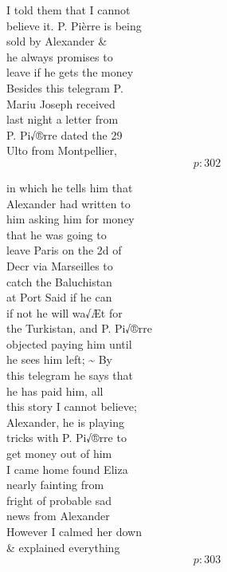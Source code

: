 \documentclass{report}
\begin{document}
	\par{
 	I told them that I cannot\ \\believe it. P. Pièrre is being\ \\sold by Alexander \&\ \\he always promises to\ \\leave if he gets the money\ \\Besides this telegram P.\ \\Mariu Joseph received\ \\last night a letter from\ \\P. Pi√®rre dated the 29\ \\Ulto from Montpellier,\ \\
  \[p: 302 \]

	}


	\par{
 	in which he tells him that\ \\Alexander had written to\ \\him asking him for money\ \\that he was going to\ \\leave Paris on the 2d of\ \\Decr via Marseilles to\ \\catch the Baluchistan\ \\at Port Said if he can\ \\if not he will wa√Æt for\ \\the Turkistan, and P. Pi√®rre\ \\objected paying him until\ \\he sees him left; \~{} By\ \\this telegram he says that\ \\he has paid him, all\ \\this story I cannot believe;\ \\Alexander, he is playing\ \\tricks with P. Pi√®rre to\ \\get money out of him\ \\I came home found Eliza\ \\nearly fainting from\ \\fright of probable sad\ \\news from Alexander\ \\However I calmed her down\ \\\& explained everything\ \\
  \[p: 303 \]

	}
\end{document}
